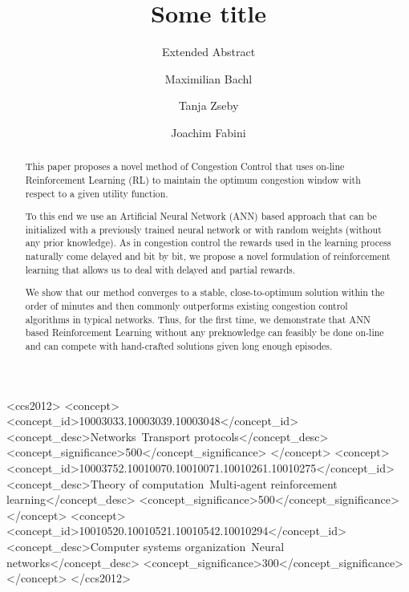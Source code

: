 \documentclass[sigconf]{acmart}
\begin{document}
\title{Some title}
\subtitle{Extended Abstract}

\author{Maximilian Bachl} 

\author{Tanja Zseby} 

\author{Joachim Fabini} 

\renewcommand{\shortauthors}{Bachl, Zseby, Fabini}

\begin{abstract}
This paper proposes a novel method of Congestion Control that uses on-line Reinforcement Learning (RL) to maintain the optimum congestion window with respect to a given utility function. 

To this end we use an Artificial Neural Network (ANN) based approach that can be initialized with a previously trained neural network or with random weights (without any prior knowledge). As in congestion control the rewards used in the learning process naturally come delayed and bit by bit, we propose a novel formulation of reinforcement learning that allows us to deal with delayed and partial rewards.

We show that our method converges to a stable, close-to-optimum solution within the order of minutes and then commonly outperforms existing congestion control algorithms in typical networks. Thus, for the first time, we demonstrate that ANN based Reinforcement Learning without any preknowledge can feasibly be done on-line and can compete with hand-crafted solutions given long enough episodes. 

\end{abstract}

%
%
\begin{CCSXML}
<ccs2012>
<concept>
<concept_id>10003033.10003039.10003048</concept_id>
<concept_desc>Networks~Transport protocols</concept_desc>
<concept_significance>500</concept_significance>
</concept>
<concept>
<concept_id>10003752.10010070.10010071.10010261.10010275</concept_id>
<concept_desc>Theory of computation~Multi-agent reinforcement learning</concept_desc>
<concept_significance>500</concept_significance>
</concept>
<concept>
<concept_id>10010520.10010521.10010542.10010294</concept_id>
<concept_desc>Computer systems organization~Neural networks</concept_desc>
<concept_significance>300</concept_significance>
</concept>
</ccs2012>
\end{CCSXML}
\end{document}
